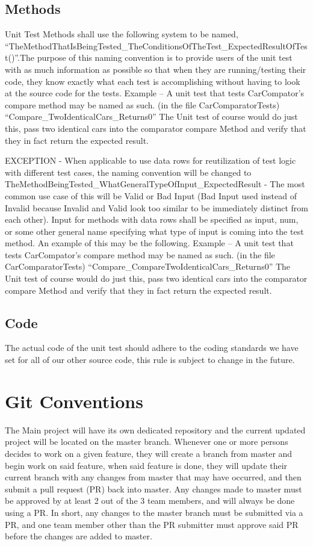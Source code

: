 \documentclass{article}
\begin{document}
\subsection{Methods}
Unit Test Methods shall use the following system to be named, \enquote{TheMethodThatIsBeingTested\_TheConditionsOfTheTest\_ExpectedResultOfTest()}.The purpose of this naming convention is to provide users of the unit test with as much information as possible so that when they are running/testing their code, they know exactly what each test is accomplishing without having to look at the source code for the tests. Example – A unit test that tests CarCompator’s compare method may be named as such. (in the file CarComparatorTests) \enquote{Compare\_TwoIdenticalCars\_Returns0} The Unit test of course would do just this, pass two identical cars into the comparator compare Method and verify that they in fact return the expected result.
\newline 
\newline

EXCEPTION - When applicable to use data rows for reutilization of test logic with different test cases, the naming convention will be changed to TheMethodBeingTested\_WhatGeneralTypeOfInput\_ExpectedResult - The most common use case of this will be Valid or Bad Input (Bad Input used instead of Invalid because Invalid and Valid look too similar to be immediately distinct from each other). Input for methods with data
rows shall be specified as input, num, or some other general name specifying what type of input is coming into the test method. An example of this may be the following.
Example – A unit test that tests CarCompator’s compare method may be named as such. (in the file CarComparatorTests)
\newline
\enquote{Compare\_CompareTwoIdenticalCars\_Returns0}
\newline
The Unit test of course would do just this, pass two identical cars into the comparator compare Method and verify that they in fact return the expected result.
\newline
\subsection{Code}
The actual code of the unit test should adhere to the coding standards we have set for all of our other source code, this rule is subject to change in the future.
\section{Git Conventions }
The Main project will have its own dedicated repository and the current updated project will be located on the master branch. Whenever one or more persons decides to work on a given feature, they will create a branch from master and begin work on said feature, when said feature is done, they will update their current branch with any changes from master that may have occurred, and then submit a pull request (PR) back into master. Any changes made to master must be approved by at least 2 out of the 3 team members, and will always be done using a PR. In short, any changes to the master branch must be submitted via a PR, and one team member other than the PR submitter must approve said PR before the changes are added to master.
\newpage
\end{document}
